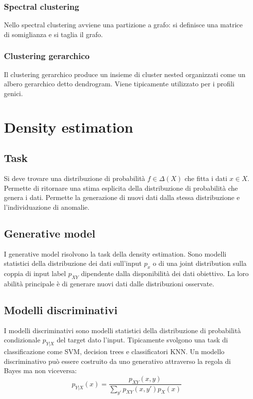 		\subsubsection{Spectral clustering}
		Nello spectral clustering avviene una partizione a grafo: si definisce una matrice di somiglianza e si taglia il grafo.

		\subsubsection{Clustering gerarchico}
		Il clustering gerarchico produce un insieme di cluster nested organizzati come un albero gerarchico detto dendrogram.
		Viene tipicamente utilizzato per i profili genici.

\section{Density estimation}

	\subsection{Task}
	Si deve trovare una distribuzione di probabilit\`a $f\in \Delta(X)$ che fitta i dati $x\in X$.
	Permette di ritornare una stima esplicita della distribuzione di probabilit\`a che genera i dati.
	Permette la generazione di nuovi dati dalla stessa distribuzione e l'individuazione di anomalie.

	\subsection{Generative model}
	I generative model risolvono la task della density estimation.
	Sono modelli statistici della distribuzione dei dati sull'input $p_x$ o di una joint distribution sulla coppia di input label $p_{XY}$ dipendente dalla disponibilit\`a dei dati obiettivo.
	La loro abilit\`a principale \`e di generare nuovi dati dalle distribuzioni osservate.

	\subsection{Modelli discriminativi}
	I modelli discriminativi sono modelli statistici della distribuzione di probabilit\`a condizionale $p_{Y|X}$ del target dato l'input.
	Tipicamente svolgono una task di classificazione come SVM, decision trees e classificatori KNN.
	Un modello discriminativo pu\`o essere costruito da uno generativo attraverso la regola di Bayes ma non viceversa:
	$$p_{Y|X}(x) = \dfrac{p_{XY}(x,y)}{\sum\limits_{y'}p_{XY}(x,y')p_X(x)}$$


